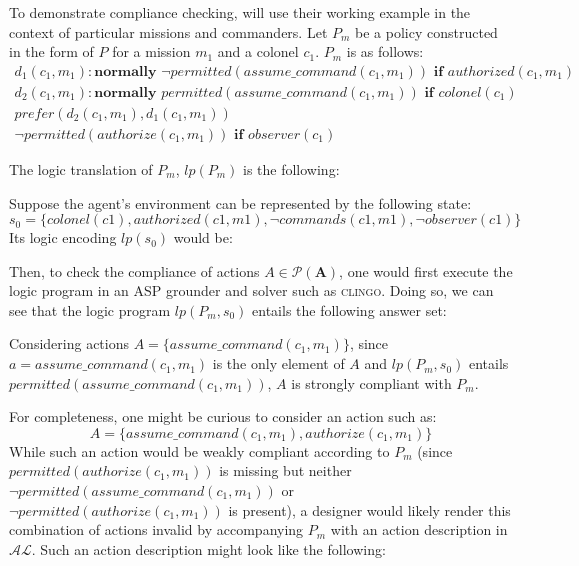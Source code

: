 To demonstrate compliance checking, \citet{gelfond_authorization_2008} will use their working example in the context of particular missions and commanders.
Let $P_m$ be a policy constructed in the form of $P$ for a mission $m_1$ and a colonel $c_1$.
$P_m$ is as follows:
\begin{gather}
    d_1(c_1, m_1): \textbf{normally } \neg permitted(assume\_command(c_1, m_1)) \textbf{ if } authorized(c_1, m_1) \\
    d_2(c_1, m_1): \textbf{normally } permitted(assume\_command(c_1, m_1)) \textbf{ if } colonel(c_1) \\
    prefer(d_2(c_1,m_1),d_1(c_1,m_1)) \\
    \neg permitted(authorize(c_1, m_1)) \textbf{ if } observer(c_1)
\end{gather}

The logic translation of $P_m$, $lp(P_m)$ is the following:


Suppose the agent's environment can be represented by the following state:
\begin{equation}
    s_0 = \{colonel(c1), authorized(c1,m1), \neg commands(c1,m1), \neg observer(c1) \}
\end{equation}
Its logic encoding $lp(s_0)$ would be:


Then, to check the compliance of actions $A \in \mathcal{P}(\boldsymbol{A})$, one would first execute the logic program in an ASP grounder and solver such as \textsc{clingo}.
Doing so, we can see that the logic program $lp(P_m, s_0)$ entails the following answer set:


Considering actions $A=\{assume\_command(c_1, m_1)\}$, since $a = assume\_command(c_1, m_1)$ is the only element of $A$ and $lp(P_m, s_0)$ entails $permitted(assume\_command(c_1, m_1))$, $A$ is strongly compliant with $P_m$.

For completeness, one might be curious to consider an action such as:
\begin{equation}
    A = \{assume\_command(c_1, m_1), authorize(c_1, m_1)\}
\end{equation}
While such an action would be weakly compliant according to $P_m$ (since $permitted(authorize(c_1, m_1))$ is missing but neither $\neg permitted(assume\_command(c_1, m_1))$ or $\neg permitted(authorize(c_1, m_1))$ is present), a designer would likely render this combination of actions invalid by accompanying $P_m$ with an action description in $\mathcal{AL}$.
Such an action description might look like the following:

